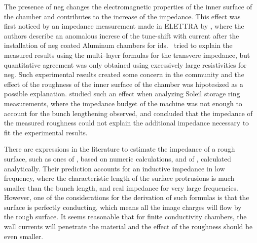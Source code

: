     The presence of \gls{neg} changes the electromagnetic properties of the inner surface of the chamber and contributes to the increase of the impedance. This effect was first noticed by an impedance measurement made in ELETTRA by , where the authors describe an anomalous increse of the tune-shift with current after the installation of \gls{neg} coated Aluminum chambers for \gls{ids}.~ tried to explain the measured results using the multi--layer formulas for the transvere impedance, but quantitative agreement was only obtained using excessively large resistivities for \gls{neg}. Such experimental results created some concern in the community and the effect of the roughness of the inner surface of the chamber was hipotesized as a possible explanation.  studied such an effect when analyzing Soleil storage ring measurements, where the impedance budget of the machine was not enough to account for the bunch lengthening observed, and concluded that the impedance of the measured roughness could not explain the additional impedance necessary to fit the experimental results.

    There are expressions in the literature to estimate the impedance of a rough surface, such as ones of , based on numeric calculations, and of , calculated analytically. Their prediction accounts for an inductive impedance in low frequency, where the characteristic length of the surface protrusions is much smaller than the bunch length, and real impedance for very large frequencies. However, one of the considerations for the derivation of such formulas is that the surface is perfectly conducting, which means all the image charges will flow by the rough surface. It seems reasonable that for finite conductivity chambers, the wall currents will penetrate the material and the effect of the roughness should be even smaller.

